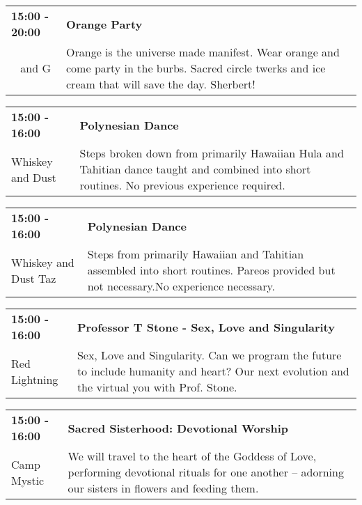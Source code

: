 \begin{tabular}{ p{1in} p{2.2in} }
    \textbf{15:00 - 20:00} & \textbf{Orange Party} \\
    ~ \newline 930 and G & Orange is the universe made manifest.  Wear orange and come party in the burbs.  Sacred circle twerks and ice cream that will save the day. Sherbert! \\
    \hline 
\end{tabular}
    
\begin{tabular}{ p{1in} p{2.2in} }
    \textbf{15:00 - 16:00} & \textbf{Polynesian Dance} \\
    Whiskey and Dust \newline  & Steps broken down from primarily Hawaiian Hula and Tahitian dance taught and combined into short routines. No previous experience required. \\
    \hline 
\end{tabular}
    
\begin{tabular}{ p{1in} p{2.2in} }
    \textbf{15:00 - 16:00} & \textbf{Polynesian Dance} \\
    Whiskey and Dust \newline Taz & Steps from primarily Hawaiian and Tahitian assembled into short routines.  Pareos provided but not necessary.No experience necessary. \\
    \hline 
\end{tabular}
    
\begin{tabular}{ p{1in} p{2.2in} }
    \textbf{15:00 - 16:00} & \textbf{Professor T Stone - Sex, Love and Singularity} \\
    Red Lightning \newline  & Sex, Love and Singularity. Can we program the future to include humanity and heart? Our next evolution and the virtual you with Prof. Stone. \\
    \hline 
\end{tabular}
    
\begin{tabular}{ p{1in} p{2.2in} }
    \textbf{15:00 - 16:00} & \textbf{Sacred Sisterhood: Devotional Worship} \\
    Camp Mystic \newline  & We will travel to the heart of the Goddess of Love, performing devotional rituals for one another -- adorning our sisters in flowers and feeding them. \\
    \hline 
\end{tabular}
    
